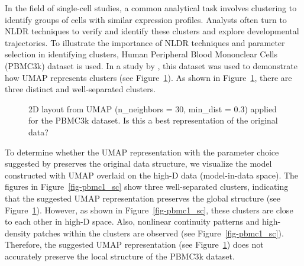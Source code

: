 \documentclass[
  12pt]{article}
\begin{document}
In the field of single-cell studies, a common analytical task involves
clustering to identify groups of cells with similar expression profiles.
Analysts often turn to NLDR techniques to verify and identify these
clusters and explore developmental trajectories. To illustrate the
importance of NLDR techniques and parameter selection in identifying
clusters, Human Peripheral Blood Mononclear Cells (PBMC3k) dataset
\citep{chen2023} is used. In a study by \citet{chen2023}, this dataset
was used to demonstrate how UMAP represents clusters (see
Figure~\ref{fig-umapauthor}). As shown in Figure~\ref{fig-umapauthor},
there are three distinct and well-separated clusters.

\begin{figure}[H]


\caption{\label{fig-umapauthor}2D layout from UMAP (n\_neighbors = 30,
min\_dist = 0.3) applied for the PBMC3k dataset. Is this a best
representation of the original data?}

\end{figure}%

To determine whether the UMAP representation with the parameter choice
suggested by \citet{chen2023} preserves the original data structure, we
visualize the model constructed with UMAP overlaid on the high-D data
(model-in-data space). The figures in Figure~\ref{fig-pbmc1_sc} show
three well-separated clusters, indicating that the suggested UMAP
representation preserves the global structure (see
Figure~\ref{fig-umapauthor}). However, as shown in
Figure~\ref{fig-pbmc1_sc}, these clusters are close to each other in
high-D space. Also, nonlinear continuity patterns and high-density
patches within the clusters are observed (see
Figure~\ref{fig-pbmc1_sc}). Therefore, the suggested UMAP representation
(see Figure~\ref{fig-umapauthor}) does not accurately preserve the local
structure of the PBMC3k dataset.
\end{document}
